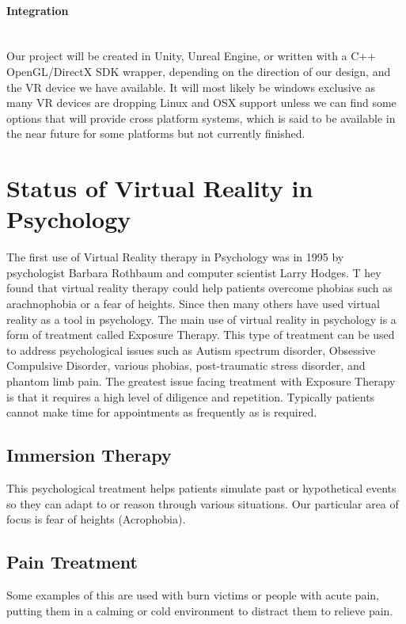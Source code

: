 \documentclass[a4paper,10pt]{article}
\begin{document}
	\paragraph{Integration} ~\\ Our project will be created in Unity, Unreal Engine, or written with a C++ OpenGL/DirectX SDK wrapper, depending on the direction of our design, and the VR device we have available. It will most likely be windows exclusive as many VR devices are dropping Linux and OSX support unless we can find some options that will provide cross platform systems, which is said to be available in the near future for some platforms but not currently finished.  
	
	\pagebreak
	
	\section{Status of Virtual Reality in Psychology}
	The first use of Virtual Reality therapy in Psychology was in 1995 by psychologist Barbara Rothbaum and computer scientist Larry Hodges. T
	hey found that virtual reality therapy could help patients overcome phobias such as arachnophobia or a fear of heights. Since then many others 
	have used virtual reality as a tool in psychology. The main use of virtual reality in psychology is a form of treatment called Exposure Therapy. 
	This type of treatment can be used to address psychological issues such as Autism spectrum disorder, Obsessive Compulsive Disorder, various phobias, 
	post-traumatic stress disorder, and phantom limb pain. The greatest issue facing treatment with Exposure Therapy is that it requires a high level of diligence and
	repetition. Typically patients cannot make time for appointments as frequently as is required.
	
	\subsection{Immersion Therapy}
	This psychological treatment helps patients simulate past or hypothetical events so they can adapt to or reason through
	various situations. Our particular area of focus is fear of heights (Acrophobia).
	\subsection{Pain Treatment}
	Some examples of this are used with burn victims or people with acute pain, putting them in a calming or cold environment to distract them to relieve pain.
\end{document}
